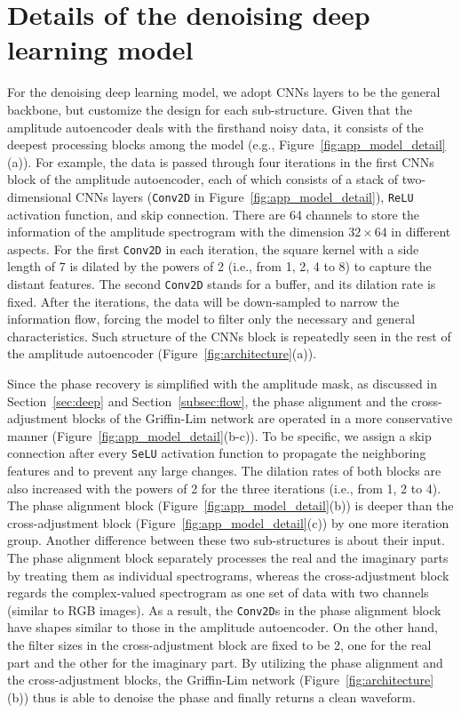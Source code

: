 \documentclass[preprint,12pt]{elsarticle}
\begin{document}
\section{Details of the denoising deep learning model}
\label{app_model_detail}
For the denoising deep learning model, we adopt CNNs layers to be the general backbone, but customize the design for each sub-structure. 
Given that the amplitude autoencoder deals with the firsthand noisy data, it consists of the deepest processing blocks among the model (e.g., Figure~\ref{fig:app_model_detail}(a)). 
For example, the data is passed through four iterations in the first CNNs block of the amplitude autoencoder, each of which consists of a stack of two-dimensional CNNs layers ({\tt Conv2D} in Figure~\ref{fig:app_model_detail}), {\tt ReLU} activation function, and skip connection. 
There are 64 channels to store the information of the amplitude spectrogram with the dimension $32\times64$ in different aspects.
For the first {\tt Conv2D} in each iteration, the square kernel with a side length of 7 is dilated by the powers of 2 (i.e., from 1, 2, 4 to 8) to capture the distant features. The second {\tt Conv2D} stands for a buffer, and its dilation rate is fixed. 
After the iterations, the data will be down-sampled to narrow the information flow, forcing the model to filter only the necessary and general characteristics. 
Such structure of the CNNs block is repeatedly seen in the rest of the amplitude autoencoder (Figure~\ref{fig:architecture}(a)). 

Since the phase recovery is simplified with the amplitude mask, as discussed in Section~\ref{sec:deep} and Section~\ref{subsec:flow}, the phase alignment and the cross-adjustment blocks of the Griffin-Lim network are operated in a more conservative manner (Figure~\ref{fig:app_model_detail}(b-c)).
To be specific, we assign a skip connection after every {\tt SeLU} activation function to propagate the neighboring features and to prevent any large changes.
The dilation rates of both blocks are also increased with the powers of 2 for the three iterations (i.e., from 1, 2 to 4). 
The phase alignment block (Figure~\ref{fig:app_model_detail}(b)) is deeper than the cross-adjustment block (Figure~\ref{fig:app_model_detail}(c)) by one more iteration group.
Another difference between these two sub-structures is about their input. 
The phase alignment block separately processes the real and the imaginary parts by treating them as individual spectrograms, whereas the cross-adjustment block regards the complex-valued spectrogram as one set of data with two channels (similar to RGB images). 
As a result, the {\tt Conv2D}s in the phase alignment block have shapes similar to those in the amplitude autoencoder. 
On the other hand, the filter sizes in the cross-adjustment block are fixed to be 2, one for the real part and the other for the imaginary part. 
By utilizing the phase alignment and the cross-adjustment blocks, the Griffin-Lim network (Figure~\ref{fig:architecture}(b)) thus is able to denoise the phase and finally returns a clean waveform.
\end{document}
